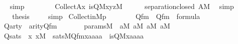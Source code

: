 \begin{isabellebody}
\ \ \ \ \isamarkupfalse%
\ simp\isanewline
\ \ \isamarkupfalse%
\ \isanewline
\ \ \isamarkupfalse%
\ {\isachardoublequoteopen}Collect{\isacharparenleft}{\kern0pt}A{\isacharcomma}{\kern0pt}{\isasymlambda}x{\isachardot}{\kern0pt}\ is{\isacharunderscore}{\kern0pt}Q{\isacharparenleft}{\kern0pt}{\isacharhash}{\kern0pt}{\isacharhash}{\kern0pt}M{\isacharcomma}{\kern0pt}x{\isacharcomma}{\kern0pt}y{\isacharcomma}{\kern0pt}z{\isacharparenright}{\kern0pt}{\isacharparenright}{\kern0pt}{\isasymin}M{\isachardoublequoteclose}\isanewline
\ \ \ \ \isamarkupfalse%
\ separation{\isacharunderscore}{\kern0pt}closed\ {\isacartoucheopen}A{\isasymin}M{\isacartoucheclose}\ \isamarkupfalse%
\ simp\ \isanewline
\ \ \isamarkupfalse%
\isanewline
\ \ \isamarkupfalse%
\ {\isacharquery}{\kern0pt}thesis\ \isamarkupfalse%
\ {}\ \isamarkupfalse%
\ simp\isanewline
{}\isamarkupfalse%
%
\endisatagproof
{\isafoldproof}%
%
\isadelimproof
\isanewline
%
\endisadelimproof
\isanewline
{}\isamarkupfalse%
\ Collect{\isacharunderscore}{\kern0pt}in{\isacharunderscore}{\kern0pt}M{\isacharunderscore}{\kern0pt}{}p\ {\isacharcolon}{\kern0pt}\isanewline
\ \ \isanewline
\ \ \ \ Qfm\ {\isacharcolon}{\kern0pt}\ {\isachardoublequoteopen}Q{\isacharunderscore}{\kern0pt}fm\ {\isasymin}\ formula{\isachardoublequoteclose}\ \isanewline
\ \ \ \ Qarty\ {\isacharcolon}{\kern0pt}\ {\isachardoublequoteopen}arity{\isacharparenleft}{\kern0pt}Q{\isacharunderscore}{\kern0pt}fm{\isacharparenright}{\kern0pt}\ {\isacharequal}{\kern0pt}\ {}{\isachardoublequoteclose}\ \isanewline
\ \ \ \ params{\isacharunderscore}{\kern0pt}M\ {\isacharcolon}{\kern0pt}\ {\isachardoublequoteopen}a{}{\isasymin}M{\isachardoublequoteclose}\ {\isachardoublequoteopen}a{}{\isasymin}M{\isachardoublequoteclose}\ {\isachardoublequoteopen}a{}{\isasymin}M{\isachardoublequoteclose}\ {\isachardoublequoteopen}a{}{\isasymin}M{\isachardoublequoteclose}\ \isanewline
\ \ \ \ Qsats\ {\isacharcolon}{\kern0pt}\ {\isachardoublequoteopen}{\isasymAnd}x{\isachardot}{\kern0pt}\ x{\isasymin}M\ {\isasymLongrightarrow}\ sats{\isacharparenleft}{\kern0pt}M{\isacharcomma}{\kern0pt}Q{\isacharunderscore}{\kern0pt}fm{\isacharcomma}{\kern0pt}{\isacharbrackleft}{\kern0pt}x{\isacharcomma}{\kern0pt}a{}{\isacharcomma}{\kern0pt}a{}{\isacharcomma}{\kern0pt}a{}{\isacharcomma}{\kern0pt}a{}{\isacharbrackright}{\kern0pt}{\isacharparenright}{\kern0pt}\ {\isasymlongleftrightarrow}\ is{\isacharunderscore}{\kern0pt}Q{\isacharparenleft}{\kern0pt}{\isacharhash}{\kern0pt}{\isacharhash}{\kern0pt}M{\isacharcomma}{\kern0pt}x{\isacharcomma}{\kern0pt}a{}{\isacharcomma}{\kern0pt}a{}{\isacharcomma}{\kern0pt}a{}{\isacharcomma}{\kern0pt}a{}{\isacharparenright}{\kern0pt}{\isachardoublequoteclose}\ \isanewline

\end{isabellebody}
